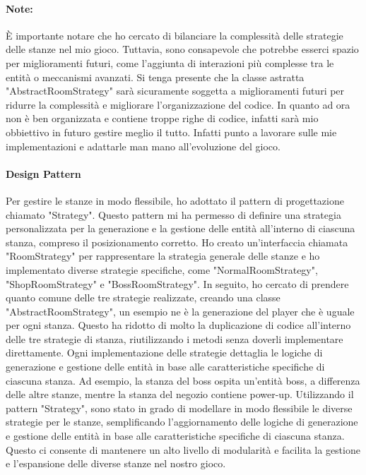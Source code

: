 \documentclass[a4paper,12pt]{report}
\begin{document}
\paragraph*{Note:}
È importante notare che ho cercato di bilanciare la complessità delle strategie delle stanze nel mio gioco. 
Tuttavia, sono consapevole che potrebbe esserci spazio per miglioramenti futuri, come l'aggiunta di interazioni più complesse tra le entità o meccanismi avanzati.
Si tenga presente che la classe astratta "AbstractRoomStrategy" sarà sicuramente soggetta a miglioramenti futuri per ridurre la complessità e migliorare l'organizzazione del codice.
In quanto ad ora non è ben organizzata e contiene troppe righe di codice, infatti sarà mio obbiettivo in futuro gestire meglio il tutto.
Infatti punto a lavorare sulle mie implementazioni e adattarle man mano all'evoluzione del gioco.

\paragraph*{Design Pattern}
Per gestire le stanze in modo flessibile, ho adottato il pattern di progettazione chiamato "Strategy". 
Questo pattern mi ha permesso di definire una strategia personalizzata per la generazione e la gestione delle entità all'interno di ciascuna stanza, compreso il posizionamento corretto.
Ho creato un'interfaccia chiamata "RoomStrategy" per rappresentare la strategia generale delle stanze e ho implementato diverse strategie specifiche, come "NormalRoomStrategy", "ShopRoomStrategy" e "BossRoomStrategy".
In seguito, ho cercato di prendere quanto comune delle tre strategie realizzate, creando una classe "AbstractRoomStrategy", un esempio ne è la generazione del player che è uguale per ogni stanza.
Questo ha ridotto di molto la duplicazione di codice all'interno delle tre strategie di stanza, riutilizzando i metodi senza doverli implementare direttamente.
Ogni implementazione delle strategie dettaglia le logiche di generazione e gestione delle entità in base alle caratteristiche specifiche di ciascuna stanza. 
Ad esempio, la stanza del boss ospita un'entità boss, a differenza delle altre stanze, mentre la stanza del negozio contiene power-up.
Utilizzando il pattern "Strategy", sono stato in grado di modellare in modo flessibile le diverse strategie per le stanze, semplificando l'aggiornamento delle logiche di generazione e gestione delle entità in base alle caratteristiche specifiche di ciascuna stanza. 
Questo ci consente di mantenere un alto livello di modularità e facilita la gestione e l'espansione delle diverse stanze nel nostro gioco.
\end{document}
